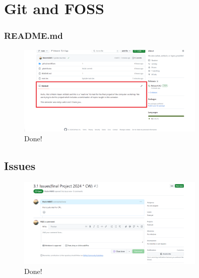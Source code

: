 \documentclass[12pt]{article}
\begin{document}
\section{Git and FOSS}

\subsubsection{README.md}
\begin{figure}[h]

  \centering

\includegraphics[width=0.8\textwidth]{read.png}

\caption{Done!}


\end{figure}
\subsection{Issues}
\begin{figure}[h]

  \centering

\includegraphics[width=0.8\textwidth]{is.png}

\caption{Done!}


\end{figure}
\end{document}
